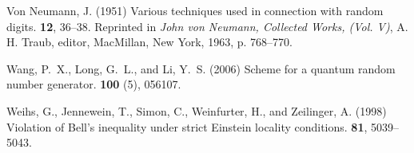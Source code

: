 \documentclass{mscs}
\begin{document}
\begin{thebibliography}{}
{Von Neumann}, J. (1951)
\newblock Various techniques used in connection with random digits.
 {\bf 12}, 36--38.
\newblock Reprinted in {\sl John {von Neumann}, Collected Works, (Vol. V)}, A.
  H. Traub, editor, MacMillan, New York, 1963, p. 768--770.

Wang, P.~X., Long, G.~L., and Li, Y.~S. (2006)
\newblock Scheme for a quantum random number generator.
 {\bf 100} (5), 056107.

Weihs, G., Jennewein, T., Simon, C., Weinfurter, H., and Zeilinger, A. (1998)
\newblock Violation of {B}ell's inequality under strict {E}instein locality
  conditions.
 {\bf 81}, 5039--5043.

\end{thebibliography}
\end{document}
